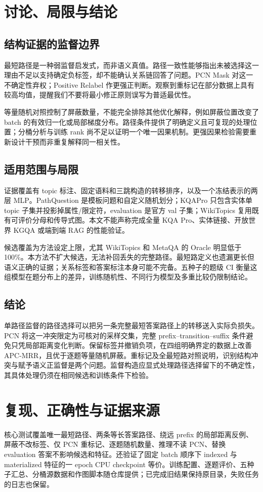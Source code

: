 \documentclass[UTF8,a4paper,10pt,fontset=fandol]{ctexart}
\begin{document}
\section{讨论、局限与结论}
\subsection{结构证据的监督边界}
最短路径是一种弱监督启发式，而非语义真值。路径一致性能够指出未被选择这一理由不足以支持确定负标签，却不能确认关系链回答了问题。PCN Mask 对这一不确定性弃权；Positive Relabel 作更强正判断。观察到重标记在部分数据上具有较高均值，提醒我们不要将最小修正原则误写为普适最优性。

等量随机对照控制了屏蔽数量，不能完全排除其他优化解释，例如屏蔽位置改变了 batch 的有效归一化或局部梯度分布。路径条件提供了明确定义且可复现的处理位置；分桶分析与训练 rank 尚不足以证明一个唯一因果机制。更强因果检验需要重新设计干预而非重复解释同一相关性。

\subsection{适用范围与局限}
证据覆盖有 topic 标注、固定语料和三跳构造的转移排序，以及一个冻结表示的两层 MLP。PathQuestion 是模板问题和自定义随机划分；KQAPro 只包含实体单 topic 子集并投影掉属性/限定符，evaluation 是官方 val 子集；WikiTopics 复用既有可评价分母和传导式图。本文不能声称完成全量 KQA Pro、实体链接、开放世界 KGQA 或端到端 RAG 的性能验证。

候选覆盖为方法设定上限，尤其 WikiTopics 和 MetaQA 的 Oracle 明显低于 100\%。本方法不扩大候选，无法补回丢失的完整路径。最短路定义也遗漏更长但语义正确的证据；关系标签和答案标注本身可能不完备。五种子的题级 CI 衡量这组模型在题分布上的差异，训练随机性、不同行为模型及多重比较仍限制结论。

\subsection{结论}
单路径监督的路径选择可以把另一条完整最短答案路径上的转移送入实际负损失。PCN 将这一冲突限定为可核对的采样交集，完整 prefix--transition--suffix 条件避免只凭局部距离变化判断。保留标签并撤销负项，在四组明确界定的数据上改善 APC-MRR，且优于逐题等量随机屏蔽。重标记及全最短路对照说明，识别结构冲突与赋予语义正监督是两个问题。监督构造应显式处理路径选择留下的不确定性，其具体处理仍须在相同候选和训练条件下检验。

\appendix
\section{复现、正确性与证据来源}
核心测试覆盖唯一最短路径、两条等长答案路径、绕远 prefix 的局部距离反例、屏蔽不改标签、仅 PCN 重标记、逐题随机数量、推理不读 PCN、替换 evaluation 答案不影响候选和特征。还验证了固定 batch 顺序下 indexed 与 materialized 特征的一 epoch CPU checkpoint 等价。训练配置、逐题评价、五种子汇总、分桶源数据和作图脚本随仓库提供；已完成旧结果保持原目录，失败任务的日志也保留。
\end{document}
